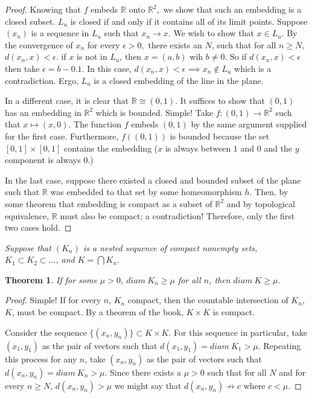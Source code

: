 \documentclass[letter]{article}
\newtheorem{theorem}{Theorem}
\newenvironment{menumerate}{%
  \edef\backupindent{\the\parindent}%
  \enumerate%
  \setlength{\parindent}{\backupindent}%
}{\endenumerate}
\begin{document}
\begin{menumerate}
\begin{proof}
				Knowing that $f$ embeds $\mathbb{R}$ onto $\mathbb{R}^2,$ we show that such an embedding is a closed subset. $L_u$ is closed if and only if it contains all of its limit points. Suppose $(x_n)$ is a sequence in $L_u$ such that $x_n \to x$. We wish to show that $x \in L_u.$ By the convergence of $x_n$ for every $\epsilon > 0,$ there exists an $N$, such that for all $n \geq N$, $d(x_n, x) < \epsilon.$ if $x$ is not in $L_u$, then $x = (a,b)$ wih $b \neq 0.$ So if $d(x_n,x) < \epsilon$ then take $\epsilon = b - 0.1.$ In this case, $d(x_n,x) < \epsilon \implies x_n \notin L_u$ which is a contradiction. Ergo, $L_u$ is a closed embedding of the line in the plane.

				In a different case, it is clear that $\mathbb{R} \cong (0,1).$ It suffices to show that $(0,1)$ has an embedding in $\mathbb{R}^2$ which is bounded. Simple! Take $f: (0,1) \to \mathbb{R}^2$ such that $x\mapsto (x,0).$ The function $f$ embeds $(0,1)$ by the same argument supplied for the first case. Furthermore, $f((0,1))$ is bounded because the set $[0,1]\times[0,1]$ contains the embedding ($x$ is always between $1$ and $0$ and the $y$ component is always $0$.) 

				In the last case, suppose there existed a closed and bounded subset of the plane such that $\mathbb{R}$ was embedded to that set by some homeomorphism $h$. Then, by some theorem that embedding is compact as a subset of $\mathbb{R}^2$ and by topological equivalence, $\mathbb{R}$ must also be compact; a contradiction! Therefore, only the first two cases hold.
			\end{proof}

		\setcounter{enumi}{52}
		\item \emph{Suppose that $(K_n)$ is a nested sequence of compact nonempty sets, $K_1 \subset K_2 \subset \dots$, and $K = \bigcap K_n.$}
			\begin{theorem}
				If for some $\mu > 0$, $diam\ K_n \geq \mu$ for all $n$, then $diam\ K \geq \mu.$
			\end{theorem}
			\begin{proof}
				Simple! If for every $n$, $K_n$ compact, then the countable intersection of $K_n$, $K$, must be compact. By a theorem of the book, $K\times K$ is compact.

					Consider the sequence $\{(x_n, y_n)\} \subset K \times K.$
				For this sequence in particular, take $(x_1,y_1)$ as the pair of vectors such that $d(x_1,y_1) = diam\ K_1 > \mu.$ Repeating this process for any $n$, take $(x_n,y_n)$ as the pair of vectors such that $d(x_n,y_n) = diam\ K_n > \mu.$ Since there exists a $\mu> 0$ such that for all $N$ and for every $n \geq N$, $d(x_n, y_n) > \mu$ we might say that $d(x_n, y_n) \nrightarrow c$ where $c <\mu.$


\end{proof}
\end{menumerate}
\end{document}
